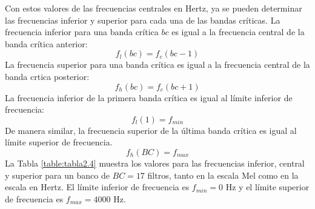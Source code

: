 \begin{enumerate}
\begin{enumerate}
\begin{equation}
\end{equation}
Con estos valores de las frecuencias centrales en Hertz, ya se pueden determinar las frecuencias inferior y superior para cada una de las bandas críticas. La frecuencia inferior para una banda crítica $bc$ es igual a la frecuencia central de la banda crítica anterior:
\begin{equation}
\label{eq:ecuacion54}
f_{l}(bc) = f_{c}(bc - 1)
\end{equation}
La frecuencia superior para una banda crítica es igual a la frecuencia central de la banda crtica posterior:
\begin{equation}
\label{eq:ecuacion55}
f_{h}(bc) = f_{c}(bc + 1)
\end{equation}
La frecuencia inferior de la primera banda crítica es igual al límite inferior de frecuencia:
\begin{equation}
\label{eq:ecuacion56}
f_{l}(1) = f_{min}
\end{equation}
De manera similar, la frecuencia superior de la última banda crítica es igual al límite superior de frecuencia.
\begin{equation}
\label{eq:ecuacion57}
f_{h}(BC) = f_{max}
\end{equation}
La Tabla \ref{table:tabla2.4} muestra los valores para las frecuencias inferior, central y superior para un banco de $BC =17$ filtros, tanto en la escala Mel como en la escala en Hertz. El límite inferior de frecuencia es $f_{min} = 0$ Hz y el límite superior de frecuencia es $f_{max} = 4000$ Hz.


\end{enumerate}
\end{enumerate}
